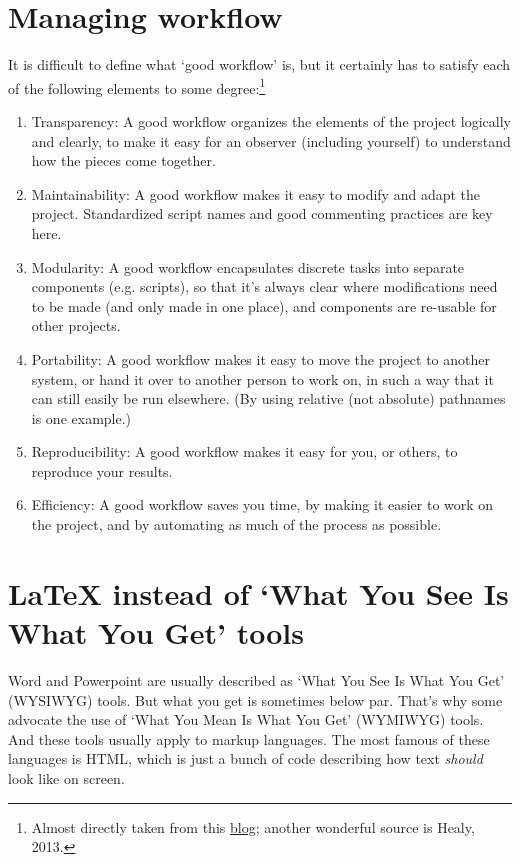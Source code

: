 \documentclass[preprint,authoryear,5p]{elsarticle}
\begin{document}
\section{Managing workflow} It is difficult to define what `good workflow' is, but it certainly has to satisfy each of the following elements to some degree:\footnote{Almost directly taken from this \href{http://blog.revolutionanalytics.com/2010/10/a-workflow-for-r.html}{blog}; another wonderful source is Healy, 2013.} 
\begin{enumerate}
	\item Transparency: A good workflow organizes the elements of the project logically and clearly, to make it easy for an observer (including yourself) to understand how the pieces come together. 
	\item Maintainability: A good workflow makes it easy to modify and adapt the project. Standardized script names and good commenting practices are key here. 
	\item Modularity: A good workflow encapsulates discrete tasks into separate components (e.g. scripts), so that it's always clear where modifications need to be made (and only made in one place), and components are re-usable for other projects. 
	\item Portability: A good workflow makes it easy to move the project to another system, or hand it over to another person to work on, in such a way that it can still easily be run elsewhere. (By using relative (not absolute) pathnames is one example.) 
	\item Reproducibility: A good workflow makes it easy for you, or others, to reproduce your results. 
	\item Efficiency: A good workflow saves you time, by making it easier to work on the project, and by automating as much of the process as possible. 
\end{enumerate}

\section{\LaTeX \: instead of `What You See Is What You Get' tools} Word and Powerpoint are usually described as `What You See Is What You Get' (WYSIWYG) tools. But what you get is sometimes below par. That's why some advocate the use of `What You Mean Is What You Get' (WYMIWYG) tools. And these tools usually apply to markup languages. The most famous of these languages is HTML, which is just a bunch of code describing how text \emph{should} look like on screen. 
\end{document}
